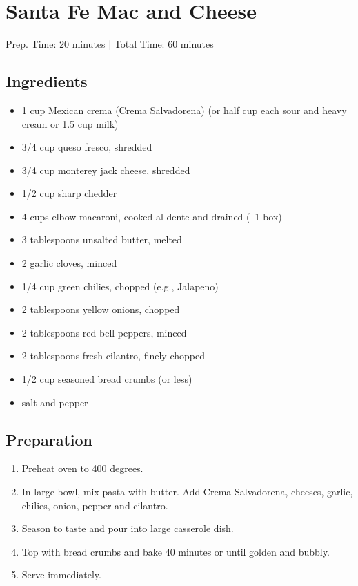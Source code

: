 \section{Santa Fe Mac and Cheese}

\begin{center}
Prep. Time: 20 minutes |
Total Time: 60 minutes
\end{center}

\subsection{Ingredients}
\begin{multicols}{2}
\begin{itemize}
    \item 1 cup Mexican crema (Crema Salvadorena) (or half cup each sour and heavy cream or 1.5 cup milk)
    \item 3/4 cup queso fresco, shredded
    \item 3/4 cup monterey jack cheese, shredded
    \item 1/2 cup sharp chedder
    \item 4 cups elbow macaroni, cooked al dente and drained (~1 box)
    \item 3 tablespoons unsalted butter, melted
    \item 2 garlic cloves, minced
    \item 1/4 cup green chilies, chopped (e.g., Jalapeno)
    \item 2 tablespoons yellow onions, chopped
    \item 2 tablespoons red bell peppers, minced
    \item 2 tablespoons fresh cilantro, finely chopped
    \item 1/2 cup seasoned bread crumbs (or less)
    \item salt and pepper
\end{itemize}
\end{multicols}

\subsection{Preparation}
\begin{enumerate}
    \item Preheat oven to 400 degrees.
    \item In large bowl, mix pasta with butter. Add Crema Salvadorena, cheeses, garlic, chilies, onion, pepper and cilantro.
    \item Season to taste and pour into large casserole dish.
    \item Top with bread crumbs and bake 40 minutes or until golden and bubbly.
    \item Serve immediately.
\end{enumerate}

